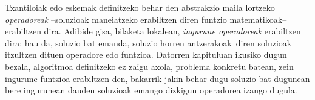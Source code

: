 \documentclass[eu]{ifirak}\usepackage[]{graphicx}\usepackage[]{color}
\newcommand{\zkk}{\guillemotleft}
\newcommand{\skk}{\guillemotright}
\begin{document}
Txantiloiak edo eskemak definitzeko behar den abstrakzio maila lortzeko \textit{operadoreak} --soluzioak maneiatzeko erabiltzen diren funtzio matematikoak-- erabiltzen dira. Adibide gisa, bilaketa lokalean, \textit{ingurune operadoreak} erabiltzen dira; hau da, soluzio bat emanda, soluzio horren \zkk antzerakoak\skk\ diren soluzioak itzultzen dituen operadore edo funtzioa. Datorren kapituluan ikusiko dugun bezala, algoritmoa definitzeko ez zaigu axola, problema konkretu batean, zein ingurune funtzioa erabiltzen den, bakarrik jakin behar dugu soluzio bat dugunean bere ingurunean dauden soluzioak emango dizkigun operadorea izango dugula.




\end{document}

